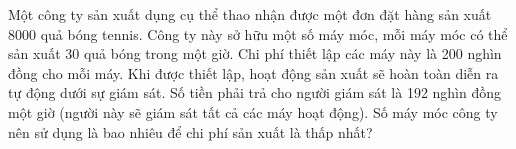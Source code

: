 \begin{ex}
 Một công ty sản xuất dụng cụ thể thao nhận được một đơn đặt hàng sản xuất 8000 quả bóng tennis. Công ty này sở hữu một số máy móc, mỗi máy móc có thể sản xuất 30 quả bóng trong một giờ. Chi phí thiết lập các máy này là 200 nghìn đồng cho mỗi máy. Khi được thiết lập, hoạt động sản xuất sẽ hoàn toàn diễn ra tự động dưới sự giám sát. Số tiền phải trả cho người giám sát là 192 nghìn đồng một giờ (người này sẽ giám sát tất cả các máy hoạt động). Số máy móc công ty nên sử dụng là bao nhiêu để chi phí sản xuất là thấp nhất?

\end{ex}

